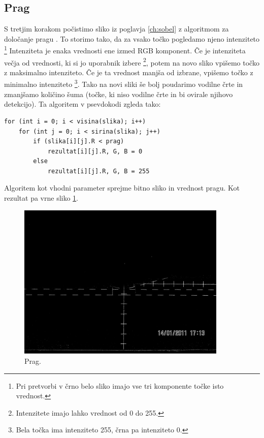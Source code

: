 \documentclass[oneside, a4paper, 12pt]{book}
\begin{document}
\subsection{Prag}
S tretjim korakom počistimo sliko iz poglavja \ref{ch:sobel} z algoritmom za določanje pragu \cite{treshold-wiki}. To storimo tako, da za vsako točko pogledamo njeno intenziteto 
\footnote{Pri pretvorbi v črno belo sliko imajo vse tri komponente točke isto vrednost.} Intenziteta je enaka vrednosti ene izmed RGB komponent. Če je intenziteta večja od vrednosti, ki si jo uporabnik izbere \footnote{Intenzitete imajo lahko vrednost od 0 do 255.}, potem na novo sliko vpišemo točko z maksimalno intenziteto. Če je ta vrednost manjša od izbrane, vpišemo točko z minimalno intenziteto \footnote{Bela točka ima intenziteto 255, črna pa intenziteto 0.}. Tako na novi sliki še bolj poudarimo vodilne črte in zmanjšamo količino šuma (točke, ki niso vodilne črte in bi ovirale njihovo detekcijo). Ta algoritem v psevdokodi zgleda tako:

\begin{verbatim}
for (int i = 0; i < visina(slika); i++)
    for (int j = 0; i < sirina(slika); j++)
        if (slika[i][j].R < prag)
            rezultat[i][j].R, G, B = 0
        else
            rezultat[i][j].R, G, B = 255
\end{verbatim}

Algoritem kot vhodni parameter sprejme bitno sliko in vrednost pragu. Kot rezultat pa vrne sliko \ref{pic:treshold}.

\begin{figure}
\begin{center}
\includegraphics[width=10cm]{slike/treshold.jpg}
\end{center}
\caption{Prag.}
\label{pic:treshold}
\end{figure}
\end{document}
